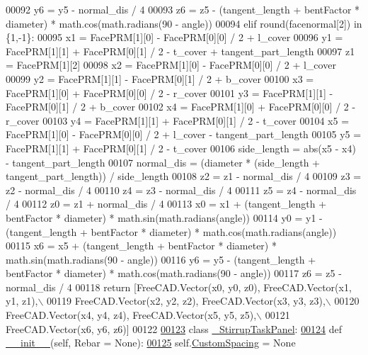 \begin{DoxyCode}
00092         y6 = y5 - normal\_dis / 4
00093         z6 = z5 - (tangent\_length + bentFactor * diameter) * math.cos(math.radians(90 - angle))
00094     \textcolor{keywordflow}{elif} round(facenormal[2]) \textcolor{keywordflow}{in} \{1,-1\}:
00095         x1 = FacePRM[1][0] - FacePRM[0][0] / 2 + l\_cover
00096         y1 = FacePRM[1][1] + FacePRM[0][1] / 2 - t\_cover + tangent\_part\_length
00097         z1 = FacePRM[1][2]
00098         x2 = FacePRM[1][0] - FacePRM[0][0] / 2 + l\_cover
00099         y2 = FacePRM[1][1] - FacePRM[0][1] / 2 + b\_cover
00100         x3 = FacePRM[1][0] + FacePRM[0][0] / 2 - r\_cover
00101         y3 = FacePRM[1][1] - FacePRM[0][1] / 2 + b\_cover
00102         x4 = FacePRM[1][0] + FacePRM[0][0] / 2 - r\_cover
00103         y4 = FacePRM[1][1] + FacePRM[0][1] / 2 - t\_cover
00104         x5 = FacePRM[1][0] - FacePRM[0][0] / 2 + l\_cover - tangent\_part\_length
00105         y5 = FacePRM[1][1] + FacePRM[0][1] / 2 - t\_cover
00106         side\_length = abs(x5 - x4) - tangent\_part\_length
00107         normal\_dis = (diameter * (side\_length + tangent\_part\_length)) / side\_length
00108         z2 = z1 - normal\_dis / 4
00109         z3 = z2 - normal\_dis / 4
00110         z4 = z3 - normal\_dis / 4
00111         z5 = z4 - normal\_dis / 4
00112         z0 = z1 + normal\_dis / 4
00113         x0 = x1 + (tangent\_length + bentFactor * diameter) * math.sin(math.radians(angle))
00114         y0 = y1 - (tangent\_length + bentFactor * diameter) * math.cos(math.radians(angle))
00115         x6 = x5 + (tangent\_length + bentFactor * diameter) * math.sin(math.radians(90 - angle))
00116         y6 = y5 - (tangent\_length + bentFactor * diameter) * math.cos(math.radians(90 - angle))
00117         z6 = z5 - normal\_dis / 4
00118     \textcolor{keywordflow}{return} [FreeCAD.Vector(x0, y0, z0), FreeCAD.Vector(x1, y1, z1),\(\backslash\)
00119             FreeCAD.Vector(x2, y2, z2), FreeCAD.Vector(x3, y3, z3),\(\backslash\)
00120             FreeCAD.Vector(x4, y4, z4), FreeCAD.Vector(x5, y5, z5),\(\backslash\)
00121             FreeCAD.Vector(x6, y6, z6)]
00122 
\hypertarget{Stirrup_8py_source.tex_l00123}{}\hyperlink{classStirrup_1_1__StirrupTaskPanel}{00123} \textcolor{keyword}{class }\hyperlink{classStirrup_1_1__StirrupTaskPanel}{\_StirrupTaskPanel}:
\hypertarget{Stirrup_8py_source.tex_l00124}{}\hyperlink{classStirrup_1_1__StirrupTaskPanel_a87e3632f8c08964f97ec549d8d156572}{00124}     \textcolor{keyword}{def }\hyperlink{classStirrup_1_1__StirrupTaskPanel_a87e3632f8c08964f97ec549d8d156572}{\_\_init\_\_}(self, Rebar = None):
\hypertarget{Stirrup_8py_source.tex_l00125}{}\hyperlink{classStirrup_1_1__StirrupTaskPanel_a88a444f6e236ba21c053f1a6540dd640}{00125}         self.\hyperlink{classStirrup_1_1__StirrupTaskPanel_a88a444f6e236ba21c053f1a6540dd640}{CustomSpacing} = \textcolor{keywordtype}{None}

\end{DoxyCode}

